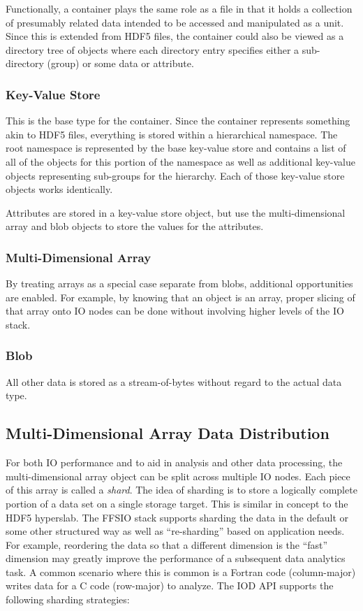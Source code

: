 \documentclass[conference]{IEEEtran}
\begin{document}
Functionally, a container plays the same role as a file in that it holds a
collection of presumably related data intended to be accessed and manipulated
as a unit. Since this is extended from HDF5 files, the container could also be
viewed as a directory tree of objects where each directory entry specifies
either a sub-directory (group) or some data or attribute.

\subsubsection{Key-Value Store}
This is the base type for the container. Since the container represents
something akin to HDF5 files, everything is stored within a hierarchical
namespace. The root namespace is represented by the base key-value store and
contains a list of all of the objects for this portion of the namespace as well
as additional key-value objects representing sub-groups for the hierarchy. Each
of those key-value store objects works identically.

Attributes are stored in a key-value store object, but use the
multi-dimensional array and blob objects to store the values for the
attributes.

\subsubsection{Multi-Dimensional Array}
By treating arrays as a special case separate from blobs, additional
opportunities are enabled. For example, by knowing that an object is an array,
proper slicing of that array onto IO nodes can be done without involving higher
levels of the IO stack.

\subsubsection{Blob}
All other data is stored as a stream-of-bytes without regard to the actual
data type.

\subsection{Multi-Dimensional Array Data Distribution}

For both IO performance and to aid in analysis and other data processing, the
multi-dimensional array object can be split across multiple IO nodes. Each
piece of this array is called a {\em shard}.  The idea of sharding is to store
a logically complete portion of a data set on a single storage target. This is
similar in concept to the HDF5 hyperslab.  The FFSIO stack supports sharding
the data in the default or some other structured way as well as ``re-sharding''
based on application needs. For example, reordering the data so that a
different dimension is the ``fast'' dimension may greatly improve the
performance of a subsequent data analytics task. A common scenario where this
is common is a Fortran code (column-major) writes data for a C code (row-major)
to analyze.  The IOD API supports the following sharding strategies:
\end{document}
